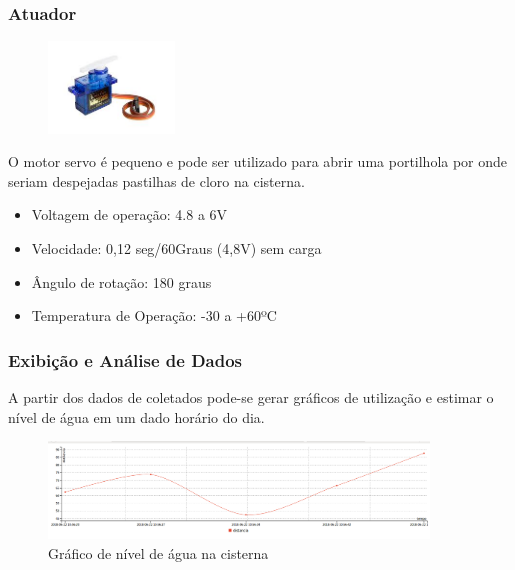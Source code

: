 \documentclass{beamer}
\begin{document}
\begin{frame}
\frametitle{Atuador}
\begin{minipage}{\textwidth}
	
	
	
	
	\begin{figure}
		\begin{center}
			\includegraphics[width=0.3\textwidth]{servo.jpeg}
		\end{center}
	\end{figure}
	
	O motor servo é pequeno e pode ser utilizado para abrir uma portilhola por onde seriam despejadas pastilhas de cloro na cisterna.
	
	\begin{itemize}
		\item Voltagem de operação: 4.8 a 6V
		\item Velocidade: 0,12 seg/60Graus (4,8V) sem carga
		\item Ângulo de rotação: 180 graus
		\item Temperatura de Operação: -30 a +60ºC
	\end{itemize}
	
\end{minipage}
\end{frame}

\begin{frame}
\frametitle{Exibição e Análise de Dados}
\begin{minipage}{\textwidth}
	
	A partir dos dados de coletados pode-se gerar gráficos de utilização e estimar o nível de água em um dado horário do dia.
	
	\begin{figure}[H]
		\centering
		\includegraphics[width=0.9\textwidth]{grafico_distancia.png}
		\caption{Gráfico de nível de água na cisterna}
		\label{fig:nfgfdfgodsdfsde_power_pisdfdns}
	\end{figure}
	
\end{minipage}
\end{frame}
\end{document}
